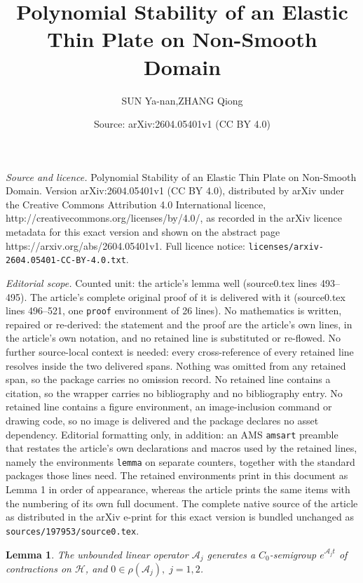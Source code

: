 \documentclass[10pt,a4paper]{amsart}
\title{Polynomial Stability of an Elastic Thin Plate on Non-Smooth Domain}
\author{SUN Ya-nan,ZHANG Qiong}
\date{Source: arXiv:2604.05401v1 (CC BY 4.0)}
\newtheorem{lemma}{Lemma}
\begin{document}
\maketitle

\noindent\emph{Source and licence.} Polynomial Stability of an Elastic Thin Plate on Non-Smooth Domain. Version arXiv:2604.05401v1 (CC BY 4.0), distributed by arXiv under the Creative Commons Attribution 4.0 International licence, http://creativecommons.org/licenses/by/4.0/, as recorded in the arXiv licence metadata for this exact version and shown on the abstract page https://arxiv.org/abs/2604.05401v1. Full licence notice: \texttt{licenses/arxiv-2604.05401-CC-BY-4.0.txt}.\par\smallskip

\noindent\textit{Editorial scope.} Counted unit: the article's lemma well (source0.tex lines 493--495). The article's complete original proof of it is delivered with it (source0.tex lines 496--521, one \texttt{proof} environment of 26 lines). No mathematics is written, repaired or re-derived: the statement and the proof are the article's own lines, in the article's own notation, and no retained line is substituted or re-flowed.  No further source-local context is needed: every cross-reference of every retained line resolves inside the two delivered spans.  Nothing was omitted from any retained span, so the package carries no omission record.  No retained line contains a citation, so the wrapper carries no bibliography and no bibliography entry.  No retained line contains a figure environment, an image-inclusion command or drawing code, so no image is delivered and the package declares no asset dependency.  Editorial formatting only, in addition: an AMS \texttt{amsart} preamble that restates the article's own declarations and macros used by the retained lines, namely the environments \texttt{lemma} on separate counters, together with the standard packages those lines need.  The retained environments print in this document as Lemma 1 in order of appearance, whereas the article prints the same items with the numbering of its own full document.  The complete native source of the article as distributed in the arXiv e-print for this exact version is bundled unchanged as \texttt{sources/197953/source0.tex}.
\begin{lemma}\label{well}
	The unbounded linear operator $\mathcal{A}_j$ generates a $C_0$-semigroup $e^{\mathcal{A}_j t}$ of contractions on $\mathcal{H} $, and $0\in\rho(\mathcal{A}_j), \; j=1,2$.
\end{lemma}
\end{document}
